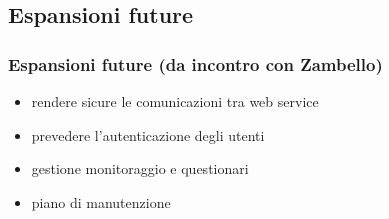 \subsection*{Espansioni future}
\begin{frame}

\frametitle{Espansioni future (da incontro con Zambello)}
\begin{itemize}
	\item rendere sicure le comunicazioni tra web service
	\item prevedere l'autenticazione degli utenti
	\item gestione monitoraggio e questionari
	\item piano di manutenzione
\end{itemize}
\end{frame}


